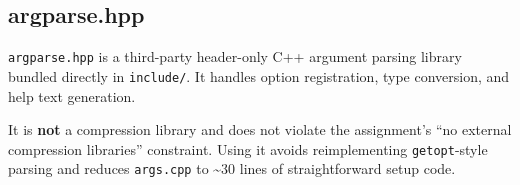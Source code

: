 \subsection{argparse.hpp}
\label{sec:argparse}

\texttt{argparse.hpp} is a third-party header-only C++ argument parsing library bundled
directly in \texttt{include/}.
It handles option registration, type conversion, and help text generation.

It is \textbf{not} a compression library and does not violate the assignment's ``no external
compression libraries'' constraint.
Using it avoids reimplementing \texttt{getopt}-style parsing and reduces
\texttt{args.cpp} to \textasciitilde{}30 lines of straightforward setup code.
